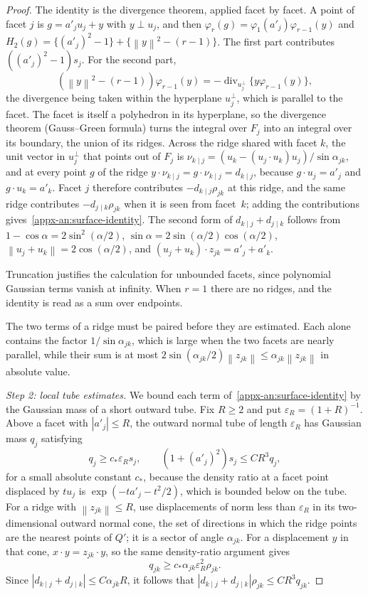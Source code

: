 \documentclass[11pt,letterpaper]{article}
\newif\ifshowrev
\newenvironment{revblock}{\ifshowrev\color{revblue}%
\hypersetup{linkcolor=revblue,citecolor=revblue,urlcolor=revblue}\fi}{}
\newif\ifshowgeo
\newenvironment{geoblock}{\ifshowgeo\color{revblue}%
\hypersetup{linkcolor=revblue,citecolor=revblue,urlcolor=revblue}\fi}{}
\theoremstyle{remark}
\newcommand{\norm}[1]{\left\lVert#1\right\rVert}
\begin{document}
\begin{revblock}
\begin{proof}
\begin{geoblock}
The identity is the divergence theorem, applied facet by facet. A point of
facet \(j\) is \(g=a'_ju_j+y\) with \(y\perp u_j\), and then
\(\varphi_r(g)=\varphi_1(a'_j)\varphi_{r-1}(y)\) and
\(H_2(g)=\{(a'_j)^2-1\}+\{\norm y^2-(r-1)\}\). The first part contributes
\(((a'_j)^2-1)s_j\). For the second part,
\[
 (\norm{y}^2-(r-1))\varphi_{r-1}(y)
 =-\operatorname{div}_{u_j^\perp}
                  \{y\varphi_{r-1}(y)\},
\]
the divergence being taken within the hyperplane \(u_j^\perp\), which is
parallel to the facet. The facet is itself a polyhedron in its hyperplane,
so the divergence theorem (Gauss--Green formula) turns the integral over
\(F_j\) into an integral over its boundary, the union of its ridges. Across
the ridge shared with facet \(k\), the unit vector in \(u_j^\perp\) that points
out of \(F_j\) is \(\nu_{k\mid j}=(u_k-(u_j\cdot u_k)u_j)/\sin\alpha_{jk}\), and
at every point \(g\) of the ridge
\(y\cdot\nu_{k\mid j}=g\cdot\nu_{k\mid j}=d_{k\mid j}\), because
\(g\cdot u_j=a'_j\) and \(g\cdot u_k=a'_k\). Facet \(j\) therefore contributes
\(-d_{k\mid j}\rho_{jk}\) at this ridge, and the same ridge contributes
\(-d_{j\mid k}\rho_{jk}\) when it is seen from facet~\(k\); adding the
contributions gives~\eqref{appx-an:surface-identity}. The second form of
\(d_{k\mid j}+d_{j\mid k}\) follows from \(1-\cos\alpha=2\sin^2(\alpha/2)\),
\(\sin\alpha=2\sin(\alpha/2)\cos(\alpha/2)\), \(\norm{u_j+u_k}=2\cos(\alpha/2)\),
and \((u_j+u_k)\cdot z_{jk}=a'_j+a'_k\).

Truncation justifies the calculation for unbounded facets, since polynomial
Gaussian terms vanish at infinity. When \(r=1\) there are no ridges, and the
identity is read as a sum over endpoints.

The two terms of a ridge must be paired before they are estimated. Each alone contains the factor
\(1/\sin\alpha_{jk}\), which is large when the two facets are nearly
parallel, while their sum is at most \(2\sin(\alpha_{jk}/2)\norm{z_{jk}}\le
\alpha_{jk}\norm{z_{jk}}\) in absolute value.
\end{geoblock}

\emph{Step 2: local tube estimates.} We bound each term
of~\eqref{appx-an:surface-identity} by the Gaussian mass of a short outward
tube. Fix \(R\ge2\) and put \(\varepsilon_R=(1+R)^{-1}\). Above a facet
with \(|a'_j|\le R\), the outward normal tube of length \(\varepsilon_R\)
has Gaussian mass \(q_j\) satisfying
\[
 q_j\ge c_*\varepsilon_Rs_j,
 \qquad (1+(a'_j)^2)s_j\le CR^3q_j,
\]
for a small absolute constant \(c_*\), because the density ratio at a
facet point displaced by \(tu_j\) is \(\exp(-ta'_j-t^2/2)\), which is
bounded below on the tube. For a ridge with \(\norm{z_{jk}}\le R\), use
displacements of norm less than \(\varepsilon_R\) in its two-dimensional
outward normal cone, the set of directions in which the ridge points are
the nearest points of \(Q'\); it is a sector of angle \(\alpha_{jk}\). For a
displacement \(y\) in that cone, \(x\cdot y=z_{jk}\cdot y\), so the same
density-ratio argument gives
\[
 q_{jk}\ge c_*\alpha_{jk}\varepsilon_R^2\rho_{jk}.
\]
Since \(|d_{k\mid j}+d_{j\mid k}|\le C\alpha_{jk}R\), it follows that
\(|d_{k\mid j}+d_{j\mid k}|\rho_{jk}\le CR^3q_{jk}\).


\end{proof}
\end{revblock}
\end{document}
